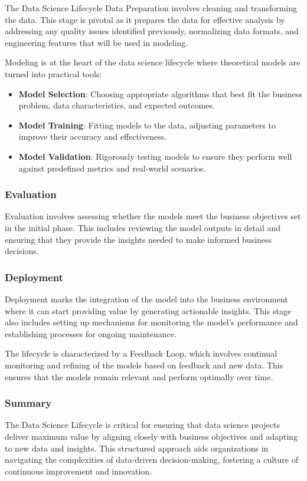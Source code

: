 \begin{notes}{The Data Science Lifecycle}
    Data Preparation involves cleaning and transforming the data. This stage is pivotal as it prepares the data for effective analysis by addressing any quality issues identified previously, normalizing 
    data formats, and engineering features that will be used in modeling.
    
    Modeling is at the heart of the data science lifecycle where theoretical models are turned into practical tools:
    \begin{itemize}
        \item \textbf{Model Selection}: Choosing appropriate algorithms that best fit the business problem, data characteristics, and expected outcomes.
        \item \textbf{Model Training}: Fitting models to the data, adjusting parameters to improve their accuracy and effectiveness.
        \item \textbf{Model Validation}: Rigorously testing models to ensure they perform well against predefined metrics and real-world scenarios.
    \end{itemize}

    \subsubsection*{Evaluation}
    
    Evaluation involves assessing whether the models meet the business objectives set in the initial phase. This includes reviewing the model outputs in detail and ensuring that they provide the insights 
    needed to make informed business decisions.

    \subsubsection*{Deployment}
    
    Deployment marks the integration of the model into the business environment where it can start providing value by generating actionable insights. This stage also includes setting up mechanisms for 
    monitoring the model's performance and establishing processes for ongoing maintenance.
    
    The lifecycle is characterized by a Feedback Loop, which involves continual monitoring and refining of the models based on feedback and new data. This ensures that the models remain relevant and perform optimally over time.
    
    \subsubsection*{Summary}
    
    The Data Science Lifecycle is critical for ensuring that data science projects deliver maximum value by aligning closely with business objectives and adapting to new data and insights. This structured 
    approach aids organizations in navigating the complexities of data-driven decision-making, fostering a culture of continuous improvement and innovation.
\end{notes}